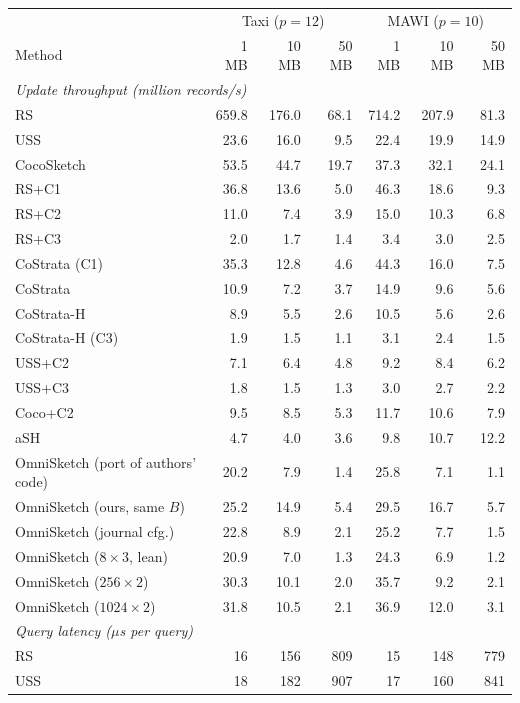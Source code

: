 \begin{tabular}{lrrrrrr}
\toprule
 & \multicolumn{3}{c}{Taxi ($p{=}12$)} & \multicolumn{3}{c}{MAWI ($p{=}10$)} \\
Method & 1 MB & 10 MB & 50 MB & 1 MB & 10 MB & 50 MB \\
\midrule
\multicolumn{7}{l}{\emph{Update throughput (million records/s)}} \\
RS & 659.8 & 176.0 & 68.1 & 714.2 & 207.9 & 81.3 \\
USS & 23.6 & 16.0 & 9.5 & 22.4 & 19.9 & 14.9 \\
CocoSketch & 53.5 & 44.7 & 19.7 & 37.3 & 32.1 & 24.1 \\
RS+C1 & 36.8 & 13.6 & 5.0 & 46.3 & 18.6 & 9.3 \\
RS+C2 & 11.0 & 7.4 & 3.9 & 15.0 & 10.3 & 6.8 \\
RS+C3 & 2.0 & 1.7 & 1.4 & 3.4 & 3.0 & 2.5 \\
CoStrata (C1) & 35.3 & 12.8 & 4.6 & 44.3 & 16.0 & 7.5 \\
CoStrata & 10.9 & 7.2 & 3.7 & 14.9 & 9.6 & 5.6 \\
CoStrata-H & 8.9 & 5.5 & 2.6 & 10.5 & 5.6 & 2.6 \\
CoStrata-H (C3) & 1.9 & 1.5 & 1.1 & 3.1 & 2.4 & 1.5 \\
USS+C2 & 7.1 & 6.4 & 4.8 & 9.2 & 8.4 & 6.2 \\
USS+C3 & 1.8 & 1.5 & 1.3 & 3.0 & 2.7 & 2.2 \\
Coco+C2 & 9.5 & 8.5 & 5.3 & 11.7 & 10.6 & 7.9 \\
aSH & 4.7 & 4.0 & 3.6 & 9.8 & 10.7 & 12.2 \\
OmniSketch (port of authors' code) & 20.2 & 7.9 & 1.4 & 25.8 & 7.1 & 1.1 \\
OmniSketch (ours, same $B$) & 25.2 & 14.9 & 5.4 & 29.5 & 16.7 & 5.7 \\
OmniSketch (journal cfg.) & 22.8 & 8.9 & 2.1 & 25.2 & 7.7 & 1.5 \\
OmniSketch ($8{\times}3$, lean) & 20.9 & 7.0 & 1.3 & 24.3 & 6.9 & 1.2 \\
OmniSketch ($256{\times}2$) & 30.3 & 10.1 & 2.0 & 35.7 & 9.2 & 2.1 \\
OmniSketch ($1024{\times}2$) & 31.8 & 10.5 & 2.1 & 36.9 & 12.0 & 3.1 \\
\midrule
\multicolumn{7}{l}{\emph{Query latency ($\mu$s per query)}} \\
RS & 16 & 156 & 809 & 15 & 148 & 779 \\
USS & 18 & 182 & 907 & 17 & 160 & 841 \\

\end{tabular}
